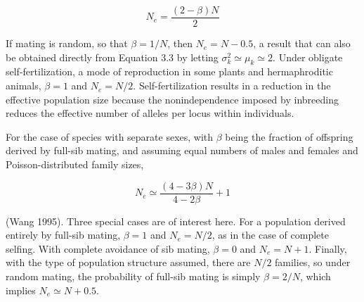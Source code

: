 \documentclass{article}
\begin{document}
\begin{equation}
N_{e}=\frac{(2-\beta)N}{2}
\tag{3.20}
\label{eq:3_20}
\end{equation}

If mating is random, so that  $ \beta = 1/N $, then  $ N_e = N - 0.5 $, a result that can also be obtained directly from Equation 3.3 by letting  $ \sigma_k^2 \simeq \mu_k \simeq 2 $. Under obligate self-fertilization, a mode of reproduction in some plants and hermaphroditic animals,  $ \beta = 1 $ and  $ N_e = N/2 $. Self-fertilization results in a reduction in the effective population size because the nonindependence imposed by inbreeding reduces the effective number of alleles per locus within individuals.

For the case of species with separate sexes, with  $ \beta $ being the fraction of offspring derived by full-sib mating, and assuming equal numbers of males and females and Poisson-distributed family sizes,

\begin{equation}
N_{e}\simeq\frac{(4-3\beta)N}{4-2\beta}+1
\tag{3.21}
\label{eq:3_21}
\end{equation}

(Wang 1995). Three special cases are of interest here. For a population derived entirely by full-sib mating,  $ \beta = 1 $ and  $ N_e = N/2 $, as in the case of complete selfing. With complete avoidance of sib mating,  $ \beta = 0 $ and  $ N_e = N + 1 $. Finally, with the type of population structure assumed, there are  $ N/2 $ families, so under random mating, the probability of full-sib mating is simply  $ \beta = 2/N $, which implies  $ N_e \simeq N + 0.5 $.
\end{document}
